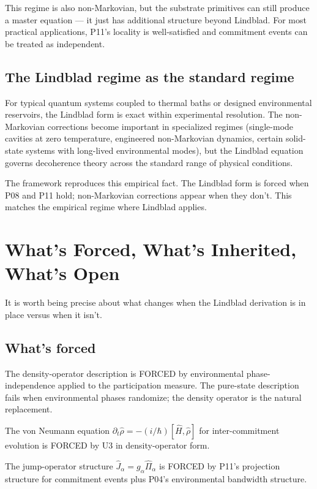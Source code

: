 \documentclass[11pt,a4paper]{article}
\begin{document}
This regime is also non-Markovian, but the substrate primitives can still produce a master equation --- it just has additional structure beyond Lindblad. For most practical applications, P11's locality is well-satisfied and commitment events can be treated as independent.

\subsection{The Lindblad regime as the standard regime}

For typical quantum systems coupled to thermal baths or designed environmental reservoirs, the Lindblad form is exact within experimental resolution. The non-Markovian corrections become important in specialized regimes (single-mode cavities at zero temperature, engineered non-Markovian dynamics, certain solid-state systems with long-lived environmental modes), but the Lindblad equation governs decoherence theory across the standard range of physical conditions.

The framework reproduces this empirical fact. The Lindblad form is forced when P08 and P11 hold; non-Markovian corrections appear when they don't. This matches the empirical regime where Lindblad applies.

\section{What's Forced, What's Inherited, What's Open}

It is worth being precise about what changes when the Lindblad derivation is in place versus when it isn't.

\subsection{What's forced}

The density-operator description is FORCED by environmental phase-independence applied to the participation measure. The pure-state description fails when environmental phases randomize; the density operator is the natural replacement.

The von Neumann equation $\partial_t\hat\rho = -(i/\hbar)[\hat H, \hat\rho]$ for inter-commitment evolution is FORCED by U3 in density-operator form.

The jump-operator structure $\hat J_\alpha = g_\alpha\hat\Pi_\alpha$ is FORCED by P11's projection structure for commitment events plus P04's environmental bandwidth structure.
\end{document}
